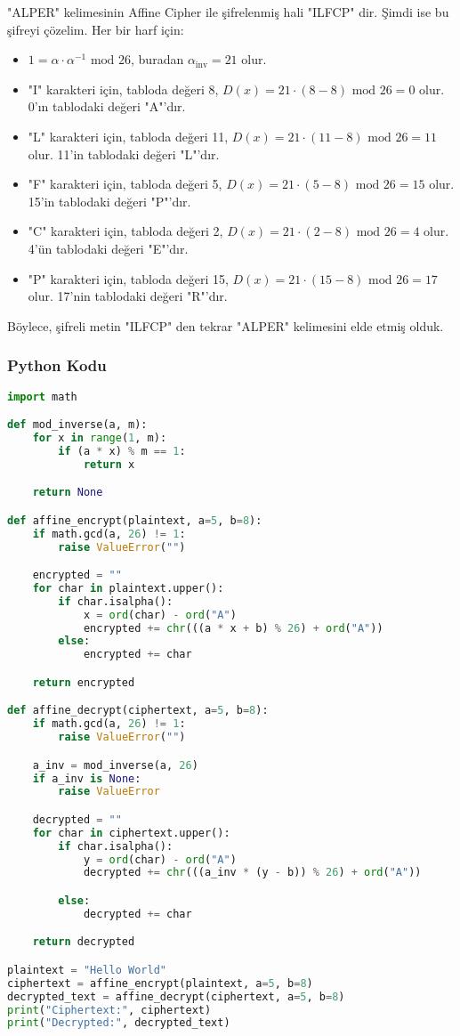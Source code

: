 "ALPER" kelimesinin Affine Cipher ile şifrelenmiş hali "ILFCP" dir. Şimdi ise bu şifreyi çözelim. Her bir harf için:

\begin{itemize}
    \item $1 = \alpha \cdot \alpha^{-1} \text{ mod } 26$, buradan $\alpha_{\text{inv}} = 21$ olur.
    \item "I" karakteri için, tabloda değeri 8, $D(x) = 21 \cdot (8 - 8) \text{ mod } 26 = 0$ olur. 0'ın tablodaki değeri "A"'dır.
    \item "L" karakteri için, tabloda değeri 11, $D(x) = 21 \cdot (11 - 8) \text{ mod } 26 = 11$ olur. 11'in tablodaki değeri "L"'dır.
    \item "F" karakteri için, tabloda değeri 5, $D(x) = 21 \cdot (5 - 8) \text{ mod } 26 = 15$ olur. 15'in tablodaki değeri "P"'dır.
    \item "C" karakteri için, tabloda değeri 2, $D(x) = 21 \cdot (2 - 8) \text{ mod } 26 = 4$ olur. 4'ün tablodaki değeri "E"'dır.
    \item "P" karakteri için, tabloda değeri 15, $D(x) = 21 \cdot (15 - 8) \text{ mod } 26 = 17$ olur. 17'nin tablodaki değeri "R"'dır.
\end{itemize}

Böylece, şifreli metin "ILFCP" den tekrar "ALPER" kelimesini elde etmiş olduk. 

\subsubsection{Python Kodu}

\begin{lstlisting}[language=Python]
import math

def mod_inverse(a, m):
    for x in range(1, m):
        if (a * x) % m == 1:
            return x

    return None

def affine_encrypt(plaintext, a=5, b=8):
    if math.gcd(a, 26) != 1:
        raise ValueError("")

    encrypted = ""
    for char in plaintext.upper():
        if char.isalpha():
            x = ord(char) - ord("A")
            encrypted += chr(((a * x + b) % 26) + ord("A"))
        else:
            encrypted += char

    return encrypted

def affine_decrypt(ciphertext, a=5, b=8):
    if math.gcd(a, 26) != 1:
        raise ValueError("")

    a_inv = mod_inverse(a, 26)
    if a_inv is None:
        raise ValueError

    decrypted = ""
    for char in ciphertext.upper():
        if char.isalpha():
            y = ord(char) - ord("A")
            decrypted += chr(((a_inv * (y - b)) % 26) + ord("A"))

        else:
            decrypted += char

    return decrypted

plaintext = "Hello World"
ciphertext = affine_encrypt(plaintext, a=5, b=8)
decrypted_text = affine_decrypt(ciphertext, a=5, b=8)
print("Ciphertext:", ciphertext)
print("Decrypted:", decrypted_text)
\end{lstlisting}


